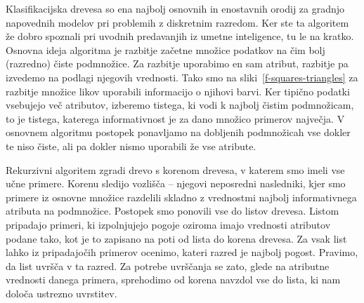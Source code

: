Klasifikacijska drevesa so ena najbolj osnovnih in enostavnih orodij za gradnjo napovednih modelov pri problemih z diskretnim razredom. Ker ste ta algoritem že dobro spoznali pri uvodnih predavanjih iz umetne inteligence, tu le na kratko. Osnovna ideja algoritma je razbitje začetne množice podatkov na čim bolj (razredno) čiste podmnožice. Za razbitje uporabimo en sam atribut, razbitje pa izvedemo na podlagi njegovih vrednosti. Tako smo na sliki~\ref{f-squares-triangles} za razbitje množice likov uporabili informacijo o njihovi barvi. Ker tipično podatki vsebujejo več atributov, izberemo tistega, ki vodi k najbolj čistim podmnožicam, to je tistega, katerega informativnost je za dano množico primerov največja. V osnovnem algoritmu postopek ponavljamo na dobljenih podmnožicah vse dokler te niso čiste, ali pa dokler nismo uporabili že vse atribute.

Rekurzivni algoritem zgradi drevo s korenom drevesa, v katerem smo imeli vse učne primere. Korenu sledijo vozlišča -- njegovi neposredni nasledniki, kjer smo primere iz osnovne množice razdelili skladno z vrednostmi najbolj informativnega atributa na podmnožice. Postopek smo ponovili vse do listov drevesa. Listom pripadajo primeri, ki izpolnjujejo pogoje oziroma imajo vrednosti atributov podane tako, kot je to zapisano na poti od lista do korena drevesa. Za vsak list lahko iz pripadajočih primerov ocenimo, kateri razred je najbolj pogost. Pravimo, da list uvršča v ta razred. Za potrebe uvrščanja se zato, glede na atributne vrednosti danega primera, sprehodimo od korena navzdol vse do lista, ki nam določa ustrezno uvrstitev.

